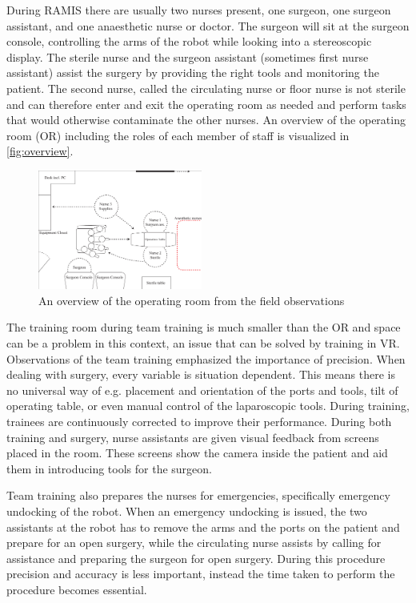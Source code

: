 \documentclass[conference]{IEEEtran}
\begin{document}
During RAMIS there are usually two nurses present, one surgeon, one surgeon assistant, and one anaesthetic nurse or doctor. The surgeon will sit at the surgeon console, controlling the arms of the robot while looking into a stereoscopic display. The sterile nurse and the surgeon assistant (sometimes first nurse assistant) assist the surgery by providing the right tools and monitoring the patient. The second nurse, called the circulating nurse or floor nurse is not sterile and can therefore enter and exit the operating room as needed and perform tasks that would otherwise contaminate the other nurses. An overview of the operating room (OR) including the roles of each member of staff is visualized in \autoref{fig:overview}.

\begin{figure}
 \centering
 \includegraphics[width=0.48\textwidth]{Figures/overview_rotated.pdf}
 \caption{An overview of the operating room from the field observations}
 \label{fig:overview}
 \end{figure}
 
The training room during team training is much smaller than the OR and space can be a problem in this context, an issue that can be solved by training in VR. Observations of the team training emphasized the importance of precision. When dealing with surgery, every variable is situation dependent. This means there is no universal way of e.g. placement and orientation of the ports and tools, tilt of operating table, or even manual control of the laparoscopic tools. During training, trainees are continuously corrected to improve their performance. During both training and surgery, nurse assistants are given visual feedback from screens placed in the room. These screens show the camera inside the patient and aid them in introducing tools for the surgeon.

Team training also prepares the nurses for emergencies, specifically emergency undocking of the robot. When an emergency undocking is issued, the two assistants at the robot has to remove the arms and the ports on the patient and prepare for an open surgery, while the circulating nurse assists by calling for assistance and preparing the surgeon for open surgery. During this procedure precision and accuracy is less important, instead the time taken to perform the procedure becomes essential. 
\end{document}
